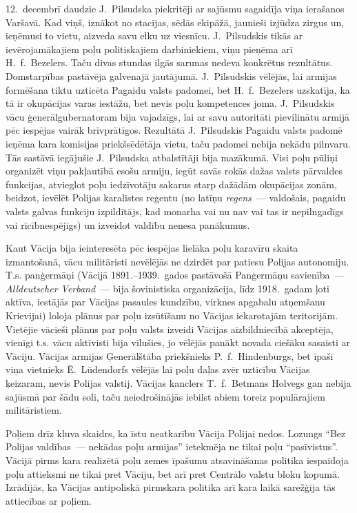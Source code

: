 \documentclass[twoside,a5paper,12pt,fleqn,openany]{extbook}
\newcommand{\detxti}[1]{\textit{\textgerman{#1}}}
\newcommand{\latxti}[1]{\textit{\textlatin{#1}}}
\begin{document}
12.~decembrī daudzie J.~Pilsudska piekritēji ar sajūsmu sagaidīja viņa ierašanos Varšavā. Kad viņš, iznākot no stacijas, sēdās ekipāžā, jaunieši izjūdza zirgus un, ieņēmusi to vietu, aizveda savu elku uz viesnīcu. J.~Pilsudskis tikās ar ievērojamākajiem poļu politiskajiem darbiniekiem, viņu pieņēma arī H.~f.~Bezelers. Taču divas stundas ilgās sarunas nedeva konkrētus rezultātus. Domstarpības pastāvēja galvenajā jautājumā. J.~Pilsudskis vēlējās, lai armijas formēšana tiktu uzticēta Pagaidu valsts padomei, bet H.~f.~Bezelers uzskatīja, ka tā ir okupācijas varas iestāžu, bet nevis poļu kompetences joma. J.~Pilsudskis vācu ģenerālgubernatoram bija vajadzīgs, lai ar savu autoritāti pievilinātu armijā pēc iespējas vairāk brīvprātīgos. Rezultātā J.~Pilsudskis Pagaidu valsts padomē ieņēma kara komisijas priekšsēdētāja vietu, taču padomei nebija nekādu pilnvaru. Tās sastāvā iegājušie J.~Pilsudska atbalstītāji bija mazākumā. Visi poļu pūliņi organizēt viņu pakļautībā esošu armiju, iegūt savās rokās dažas valsts pārvaldes funkcijas, atvieglot poļu iedzīvotāju sakarus starp dažādām okupācijas zonām, beidzot, ievēlēt Polijas karalistes reģentu (no latīņu \latxti{regens}~--- valdošais, pagaidu valsts galvas funkciju izpildītājs, kad monarha vai nu nav vai tas ir nepilngadīgs vai rīcībnespējīgs) un izveidot valdību nenesa panākumus.

Kaut Vācija bija ieinteresēta pēc iespējas lielāka poļu karavīru skaita izmantošanā, vācu militāristi nevēlējās ne dzirdēt par patiesu Polijas autonomiju. T.s. panģermāņi (Vācijā 1891.--1939.~gados pastāvošā Panģermāņu savienība~--- \detxti{Alldeutscher Verband}~--- bija šovinistiska organizācija, līdz 1918.~gadam ļoti aktīva, iestājās par Vācijas pasaules kundzību, virknes apgabalu atņemšanu Krievijai) loloja plānus par poļu izsūtīšanu no Vācijas iekarotajām teritorijām. Vietējie vācieši plānus par poļu valsts izveidi Vācijas aizbildniecībā akceptēja, vienīgi t.s. vācu aktīvisti bija vīlušies, jo vēlējās panākt novada ciešāku sasaisti ar Vāciju. Vācijas armijas Ģenerālštāba priekšnieks P.~f.~Hindenburgs, bet īpaši viņa vietnieks Ē.~Lūdendorfs vēlējās lai poļu daļas zvēr uzticību Vācijas ķeizaram, nevis Polijas valstij. Vācijas kanclers T.~f.~Betmans Holvegs gan nebija sajūsmā par šādu soli, taču neiedrošinājās iebilst abiem toreiz populārajiem militāristiem.

Poļiem drīz kļuva skaidrs, ka īstu neatkarību Vācija Polijai nedos. Lozungs ``Bez Polijas valdības~--- nekādas poļu armijas'' ietekmēja ne tikai poļu ``pasīvistus''. Vācijā pirms kara realizētā poļu zemes īpašumu atsavināšanas politika iespaidoja poļu attieksmi ne tikai pret Vāciju, bet arī pret Centrālo valstu bloku kopumā. Izrādījās, ka Vācijas antipoliskā pirmskara politika arī kara laikā sarežģīja tās attiecības ar poļiem.
\end{document}

